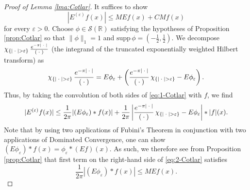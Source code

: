 \documentclass[../dissertation.tex]{subfiles}
\begin{document}
\begin{proof}[Proof of Lemma \ref{lma:Cotlar}]
    It suf{}fices to show 
    \[
        |E^{(\varepsilon)} f(x)| \leq M E f(x) + C M f(x)
    \]
    for every $\varepsilon > 0$. Choose $\phi \in \mathscr S(\mathbb R)$ satisfying the 
    hypotheses of Proposition \ref{prop:Cotlar} so that $\| \phi\|_1 = 1$ and 
    $\text{supp} \, \phi = \left(-\frac{1}{2}, \frac{1}{2} \right)$. We decompose 
    $\chi_{\{|\kern 0.5ex \cdot \kern 0.5ex| > \varepsilon\}} \, \frac{e^{-\pi |\kern 0.5ex \cdot \kern 0.5ex|}}{(\kern 0.5ex \cdot \kern 0.5ex)}$ (the integrand 
    of the truncated exponentially weighted Hilbert transform) as
    \begin{align}\label{eq:1-Cotlar}
    	\chi_{\{|\kern 0.5ex \cdot \kern 0.5ex| > \varepsilon\}} \, \frac{e^{-\pi |\kern 0.5ex \cdot \kern 0.5ex|}}{(\kern 0.5ex \cdot \kern 0.5ex)}
    		= E \phi_\varepsilon +
            	\left( 
            		 \frac{e^{-\pi |\kern 0.5ex \cdot \kern 0.5ex|}}{(\kern 0.5ex \cdot \kern 0.5ex)} \, \chi_{\{|\kern 0.5ex \cdot \kern 0.5ex| > \varepsilon\}}
            			- E \phi_\varepsilon 
        	   	\right).
    \end{align}
    Thus, by taking the convolution of both sides of \eqref{eq:1-Cotlar} with $f$, we find
    \begin{align}\label{eq:2-Cotlar}
        |E^{(\varepsilon)} f(x)|
            \leq \frac{1}{2\pi} | (E\phi_\varepsilon)*f(x)| 
                + \frac{1}{2\pi} 
                	\left| 
                		\frac{e^{-\pi |\kern 0.5ex \cdot \kern 0.5ex|}}{(\kern 0.5ex \cdot \kern 0.5ex)} \, \chi_{\{|\kern 0.5ex \cdot \kern 0.5ex| > \varepsilon\}}
                			- E\phi_\varepsilon 
                	\right|*|f|(x).
    \end{align}
    Note that by using two applications of Fubini's Theorem in conjunction with two 
    applications of Dominated Convergence, one can show
    $(E\phi_\varepsilon)*f(x) = \phi_\varepsilon * (Ef)(x)$. As such, we therefore 
    see from Proposition \ref{prop:Cotlar} that first term on the right-hand side 
    of \eqref{eq:2-Cotlar} satisfies
    \[
        \frac{1}{2 \pi} | (E\phi_\varepsilon)*f(x)| \leq M E f(x).
    \]


\end{proof}
\end{document}
